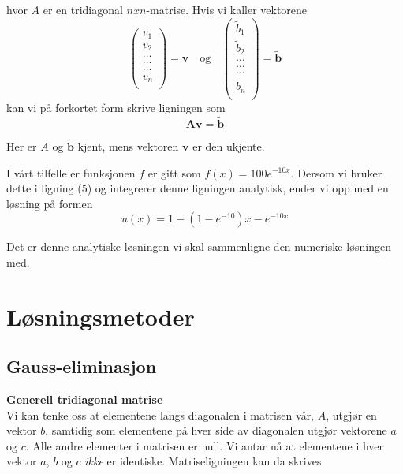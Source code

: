\documentclass{article}
\begin{document}
hvor $A$ er en tridiagonal $nxn$-matrise. Hvis vi kaller vektorene
\begin{equation}
\left(\begin{array}{c}
                           v_1\\
                           v_2\\
                           \dots \\
                          \dots  \\
                          \dots \\
                           v_n\\
                      \end{array} \right) = \textbf{v} \quad \textrm{og} \quad 
                      \left(\begin{array}{c}
                           \tilde{b}_1\\
                           \tilde{b}_2\\
                           \dots \\
                           \dots \\
                          \dots \\
                           \tilde{b}_n\\
                      \end{array} \right) =\tilde{\textbf{b}}
\end{equation}
kan vi på forkortet form skrive ligningen som
\begin{equation}
\textbf{Av} = \tilde{\textbf{b}}
\end{equation}

Her er $A$ og $\tilde{\textbf{b}}$ kjent, mens vektoren $\textbf{v}$ er den ukjente.

I vårt tilfelle er funksjonen $f$ er gitt som $f(x) = 100e^{-10x}$. Dersom vi bruker dette i ligning (5) og integrerer denne ligningen analytisk, ender vi opp med en løsning på formen
\begin{equation}
u(x) = 1- (1-e^{-10})x-e^{-10x}
\end{equation}

Det er denne analytiske løsningen vi skal sammenligne den numeriske løsningen med. 

\section{Løsningsmetoder}
\subsection{Gauss-eliminasjon}
\textbf{Generell tridiagonal matrise}\\
Vi kan tenke oss at elementene langs diagonalen i matrisen vår, $A$, utgjør en vektor $b$, samtidig som elementene på hver side av diagonalen utgjør vektorene $a$ og $c$. Alle andre elementer i matrisen er null. Vi antar nå at elementene i hver vektor $a$, $b$ og $c$ \textit{ikke} er identiske. Matriseligningen kan da skrives
\end{document}
